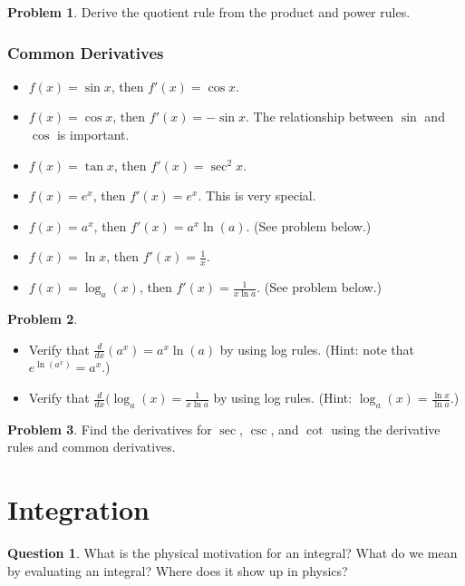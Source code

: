 \documentclass[12pt]{article}
\theoremstyle{definition}
\newtheorem{problem}{Problem}[section]
\newtheorem{question}{Question}[section]
\begin{document}
\begin{problem}
Derive the quotient rule from the product and power rules.
\end{problem}


\subsubsection{Common Derivatives}

\begin{itemize}
    \item $f(x)=\sin x$, then $f'(x)=\cos x.$
    \item $f(x)=\cos x$, then $f'(x)=-\sin x$. The relationship between $\sin$ and $\cos$ is important.
    \item $f(x)=\tan x$, then $f'(x)=\sec^2 x$.
    \item $f(x)=e^x$, then $f'(x)=e^x$. This is very special.
    \item $f(x)=a^x$, then $f'(x)=a^x \ln(a)$. (See problem below.)
    \item $f(x)=\ln x$, then $f'(x)=\frac{1}{x}$. 
    \item $f(x)=\log_a(x)$, then $f'(x)=\frac{1}{x\ln a}.$ (See problem below.)
\end{itemize}

\begin{problem}~
\begin{itemize}
    \item Verify that $\frac{d}{dx}(a^x)=a^x \ln(a)$ by using log rules.  (Hint: note that $e^{\ln(a^x)}=a^x$.)
    \item Verify that $\frac{d}{dx}(\log_a(x)=\frac{1}{x\ln a}$ by using log rules. (Hint: $\log_a(x)=\frac{\ln x}{\ln a}$.)
\end{itemize}
\end{problem}

\begin{problem}
Find the derivatives for $\sec$, $\csc$, and $\cot$ using the derivative rules and common derivatives.
\end{problem}

\section{Integration}

\begin{question}
What is the physical motivation for an integral? What do we mean by evaluating an integral? Where does it show up in physics?
\end{question}
\end{document}
